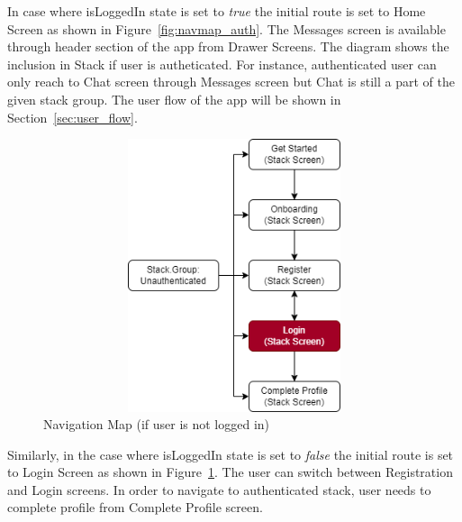 In case where isLoggedIn state is set to \emph{true} the initial route is set to Home Screen as shown in Figure~\ref{fig:navmap_auth}. The Messages screen is available through header section of the app from Drawer Screens. The diagram shows the inclusion in Stack if user is autheticated. For instance, authenticated user can only reach to Chat screen through Messages screen but Chat is still a part of the given stack group. The user flow of the app will be shown in Section~\ref{sec:user_flow}.
\begin{figure}[H]
	\centering
	\includegraphics[width=1\textwidth,width=8cm, height=8cm]{images/SB_unauth.png}
	\caption{Navigation Map (if user is not logged in)}
	\label{fig:navmap_unauth}
\end{figure}
Similarly, in the case where isLoggedIn state is set to \emph{false} the initial route is set to Login Screen as shown in Figure~\ref{fig:navmap_unauth}. The user can switch between Registration and Login screens. In order to navigate to authenticated stack, user needs to complete profile from Complete Profile screen.
